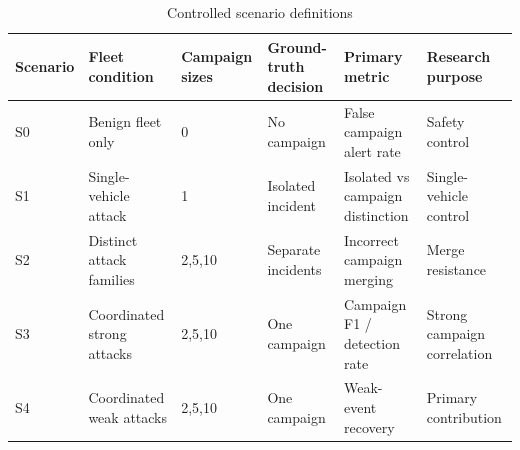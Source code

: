 \begin{table}[t]
\centering
\begin{tabular}{llllll}
\toprule
Scenario & Fleet condition & Campaign sizes & Ground-truth decision & Primary metric & Research purpose \\
\midrule
S0 & Benign fleet only & 0 & No campaign & False campaign alert rate & Safety control \\
S1 & Single-vehicle attack & 1 & Isolated incident & Isolated vs campaign distinction & Single-vehicle control \\
S2 & Distinct attack families & 2,5,10 & Separate incidents & Incorrect campaign merging & Merge resistance \\
S3 & Coordinated strong attacks & 2,5,10 & One campaign & Campaign F1 / detection rate & Strong campaign correlation \\
S4 & Coordinated weak attacks & 2,5,10 & One campaign & Weak-event recovery & Primary contribution \\
\bottomrule
\end{tabular}
\caption{Controlled scenario definitions}
\label{tab:scenario_definitions}
\end{table}
